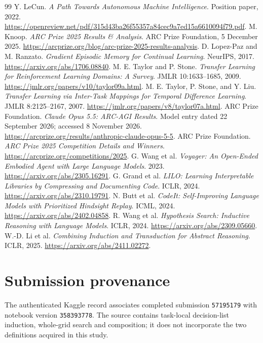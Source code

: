 \documentclass[11pt]{article}
\begin{document}
\begin{thebibliography}{99}
 Y. LeCun. \emph{A Path Towards Autonomous Machine Intelligence}. Position paper, 2022. \url{https://openreview.net/pdf/315d43ba26f55357a84cec9a7ed15a6610094f79.pdf}.
 M. Knoop. \emph{ARC Prize 2025 Results \& Analysis}. ARC Prize Foundation, 5 December 2025. \url{https://arcprize.org/blog/arc-prize-2025-results-analysis}.
 D. Lopez-Paz and M. Ranzato. \emph{Gradient Episodic Memory for Continual Learning}. NeurIPS, 2017. \url{https://arxiv.org/abs/1706.08840}.
 M. E. Taylor and P. Stone. \emph{Transfer Learning for Reinforcement Learning Domains: A Survey}. JMLR 10:1633--1685, 2009. \url{https://jmlr.org/papers/v10/taylor09a.html}.
 M. E. Taylor, P. Stone, and Y. Liu. \emph{Transfer Learning via Inter-Task Mappings for Temporal Difference Learning}. JMLR 8:2125--2167, 2007. \url{https://jmlr.org/papers/v8/taylor07a.html}.
 ARC Prize Foundation. \emph{Claude Opus 5.5: ARC-AGI Results}. Model entry dated 22 September 2026; accessed 8 November 2026. \url{https://arcprize.org/results/anthropic-claude-opus-5-5}.
 ARC Prize Foundation. \emph{ARC Prize 2025 Competition Details and Winners}. \url{https://arcprize.org/competitions/2025}.
 G. Wang et al. \emph{Voyager: An Open-Ended Embodied Agent with Large Language Models}. 2023. \url{https://arxiv.org/abs/2305.16291}.
 G. Grand et al. \emph{LILO: Learning Interpretable Libraries by Compressing and Documenting Code}. ICLR, 2024. \url{https://arxiv.org/abs/2310.19791}.
 N. Butt et al. \emph{CodeIt: Self-Improving Language Models with Prioritized Hindsight Replay}. ICML, 2024. \url{https://arxiv.org/abs/2402.04858}.
 R. Wang et al. \emph{Hypothesis Search: Inductive Reasoning with Language Models}. ICLR, 2024. \url{https://arxiv.org/abs/2309.05660}.
 W.-D. Li et al. \emph{Combining Induction and Transduction for Abstract Reasoning}. ICLR, 2025. \url{https://arxiv.org/abs/2411.02272}.
\end{thebibliography}

\appendix
\section{Submission provenance}\label{app:notebook-identity}
The authenticated Kaggle record associates completed submission \texttt{57195179} with notebook version \texttt{358393778}. The source contains task-local decision-list induction, whole-grid search and composition; it does not incorporate the two definitions acquired in this study.
\end{document}
